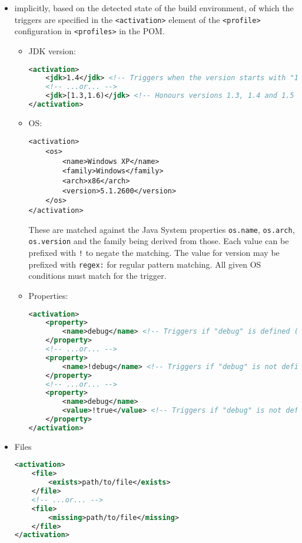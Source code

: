 \documentclass[8pt, table, xcdraw]{article}%
\begin{document}
\begin{itemize}
\begin{itemize}
        \begin{lstlisting}[language=XML]
<profiles>
    <profile>
    <id>profileOne</id>
        <activation>
            <activeByDefault>true</activeByDefault>
        </activation>
    </profile>
</profiles>
        \end{lstlisting}
        All profiles that are \lstinline{activeByDefault} in the POM are automatically deactivated when a profile in the POM is activated on the command line or through its activation config.
    \end{itemize}
    \item implicitly, based on the detected state of the build environment, of which the triggers are specified in the \lstinline{<activation>} element of the \lstinline{<profile>} configuration in \lstinline{<profiles>} in the POM.
    \begin{itemize}
        \item JDK version:
        \begin{lstlisting}[language=XML]
<activation>
    <jdk>1.4</jdk> <!-- Triggers when the version starts with "1.4" -->
    <!-- ...or... -->
    <jdk>[1.3,1.6)</jdk> <!-- Honours versions 1.3, 1.4 and 1.5 -->
</activation>
        \end{lstlisting}
        \item OS:
        \begin{lstlisting}
<activation>
    <os>
        <name>Windows XP</name>
        <family>Windows</family>
        <arch>x86</arch>
        <version>5.1.2600</version>
    </os>
</activation>
        \end{lstlisting}
        These are matched against the Java System properties \lstinline{os.name}, \lstinline{os.arch}, \lstinline{os.version} and the family being derived from those. Each value can be prefixed with \lstinline{!} to negate the matching. The value for version may be prefixed with \lstinline{regex:} for regular pattern matching. All given OS conditions must match for the trigger.
        \item Properties:
        \begin{lstlisting}[language=XML]
<activation>
    <property>
        <name>debug</name> <!-- Triggers if "debug" is defined (with any value) -->
    </property>
    <!-- ...or... -->
    <property>
        <name>!debug</name> <!-- Triggers if "debug" is not defined -->
    </property>
    <!-- ...or... -->
    <property>
        <name>debug</name>
        <value>!true</value> <!-- Triggers if "debug" is not defined or is defined with a value which is not "true" -->
    </property>
</activation>
        \end{lstlisting}
    \end{itemize}
    \item Files
    \begin{lstlisting}[language=XML]
<activation>
    <file>
        <exists>path/to/file</exists>
    </file>
    <!-- ...or... -->
    <file>
        <missing>path/to/file</missing>
    </file>
</activation>
    \end{lstlisting}
\end{itemize}
\end{document}
